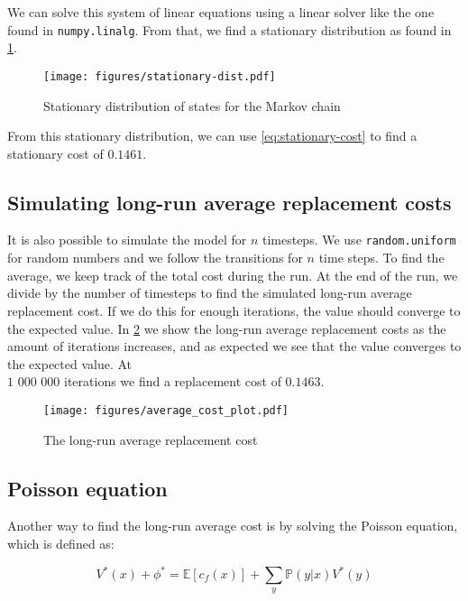 \documentclass{uniarticle}
\begin{document}
We can solve this system of linear equations using a linear solver like the
one found in \verb|numpy.linalg|.
From that, we find a stationary distribution as found in
\cref{fig:stationary-dist}.

\begin{figure}[h]
    \texttt{[image: figures/stationary-dist.pdf]}
    \caption{Stationary distribution of states for the Markov chain}
    \label{fig:stationary-dist}
\end{figure}

From this stationary distribution, we can use \cref{eq:stationary-cost} to find
a stationary cost of $0.1461$.

\subsection{Simulating long-run average replacement costs}

It is also possible to simulate the model for $n$ timesteps. We use
\verb|random.uniform| for random numbers and we follow the transitions for
$n$ time steps. To find the average, we keep track of the total cost during the
run. At the end of the run, we divide by the number of timesteps to find the
simulated long-run average replacement cost. If we do this for enough
iterations, the value should converge to the expected value.
In \cref{fig:simulation} we show the long-run average replacement costs as the
amount of iterations increases, and as expected we see that the value converges
to the expected value. At \\ $1$ $000$ $000$ iterations we find a replacement cost of $0.1463$.

\begin{figure}
    \texttt{[image: figures/average\_cost\_plot.pdf]}
    \caption{The long-run average replacement cost}
    \label{fig:simulation}
\end{figure}

\subsection{Poisson equation}

Another way to find the long-run average cost is by solving the Poisson
equation, which is defined as:

\begin{equation}\label{eq:poisson-raw}
    V^*(x) + \phi^* = \mathbb{E}\left[c_f(x)\right] + \sum_y \mathbb{P} \left(y | x \right) V^*(y)
\end{equation}
\end{document}
